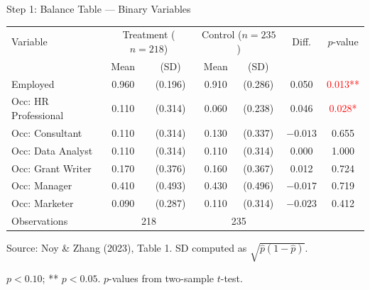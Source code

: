 \documentclass[hyperref={pdfpagelabels=false}]{beamer}
\begin{document}
	\begin{frame}{Step 1: Balance Table --- Binary Variables}
		\begin{center}
			\begin{threeparttable}
				\linespread{1}
				\fontsize{8}{8pt}\selectfont
				\centering
				\begin{tabular}{@{}lcccccc@{}}
					\toprule
					Variable & \multicolumn{2}{c}{Treatment ($n=218$)} & \multicolumn{2}{c}{Control ($n=235$)} & Diff. & $p$-value \\
					& Mean & (SD) & Mean & (SD) & & \\
					\midrule\midrule
					Employed & 0.960 & (0.196) & 0.910 & (0.286) & 0.050 & \textcolor{red}{0.013**} \\
					\midrule
					Occ: HR Professional & 0.110 & (0.314) & 0.060 & (0.238) & 0.046 & \textcolor{red}{0.028*} \\
					Occ: Consultant & 0.110 & (0.314) & 0.130 & (0.337) & $-0.013$ & 0.655 \\
					Occ: Data Analyst & 0.110 & (0.314) & 0.110 & (0.314) & 0.000 & 1.000 \\
					Occ: Grant Writer & 0.170 & (0.376) & 0.160 & (0.367) & 0.012 & 0.724 \\
					Occ: Manager & 0.410 & (0.493) & 0.430 & (0.496) & $-0.017$ & 0.719 \\
					Occ: Marketer & 0.090 & (0.287) & 0.110 & (0.314) & $-0.023$ & 0.412 \\
					\midrule\midrule
					Observations & \multicolumn{2}{c}{218} & \multicolumn{2}{c}{235} & & \\
					\bottomrule
				\end{tabular}
				\begin{tablenotes}
					\fontsize{7}{7pt}\selectfont
					\item Source: Noy \& Zhang (2023), Table 1. SD computed as $\sqrt{\hat{p}(1-\hat{p})}$.
					\item * $p<0.10$; ** $p<0.05$. $p$-values from two-sample $t$-test.
				\end{tablenotes}
			\end{threeparttable}
		\end{center}
	\end{frame}
	
\end{document}
